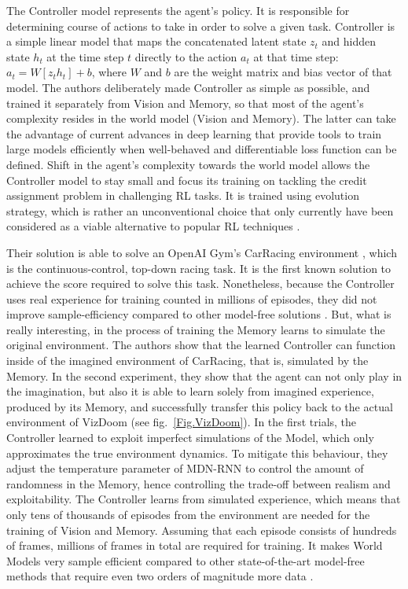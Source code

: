 The Controller model represents the agent's policy. It is responsible for determining course of actions to take in order to solve a given task. Controller is a simple linear model that maps the concatenated latent state $z_t$ and hidden state $h_t$ at the time step $t$ directly to the action $a_t$ at that time step: $a_t = W[z_t h_t] + b$, where $W$ and $b$ are the weight matrix and bias vector of that model.
The authors deliberately made Controller as simple as possible, and trained it separately from Vision and Memory, so that most of the agent's complexity resides in the world model (Vision and Memory). The latter can take the advantage of current advances in deep learning that provide tools to train large models efficiently when well-behaved and differentiable loss function can be defined.
Shift in the agent's complexity towards the world model allows the Controller model to stay small and focus its training on tackling the credit assignment problem in challenging RL tasks. It is trained using evolution strategy, which is rather an unconventional choice that only currently have been considered as a viable alternative to popular RL techniques \cite{Algo.ESRL}.

Their solution is able to solve an OpenAI Gym's CarRacing environment \cite{Code.OpenAIGym}, which is the continuous-control, top-down racing task. It is the first known solution to achieve the score required to solve this task. Nonetheless, because the Controller uses real experience for training counted in millions of episodes, they did not improve sample-efficiency compared to other model-free solutions \cite{Algo.CarRacingA3C}. But, what is really interesting, in the process of training the Memory learns to simulate the original environment. The authors show that the learned Controller can function inside of the imagined environment of CarRacing, that is, simulated by the Memory.
In the second experiment, they show that the agent can not only play in the imagination, but also it is able to learn solely from imagined experience, produced by its Memory, and successfully transfer this policy back to the actual environment of VizDoom (see fig.~\ref{Fig.VizDoom}). In the first trials, the Controller learned to exploit imperfect simulations of the Model, which only approximates the true environment dynamics. To mitigate this behaviour, they adjust the temperature parameter of MDN-RNN to control the amount of randomness in the Memory, hence controlling the trade-off between realism and exploitability.
The Controller learns from simulated experience, which means that only tens of thousands of episodes from the environment are needed for the training of Vision and Memory. Assuming that each episode consists of hundreds of frames, millions of frames in total are required for training. It makes World Models very sample efficient compared to other state-of-the-art model-free methods that require even two orders of magnitude more data \cite{Algo.A3C}.

